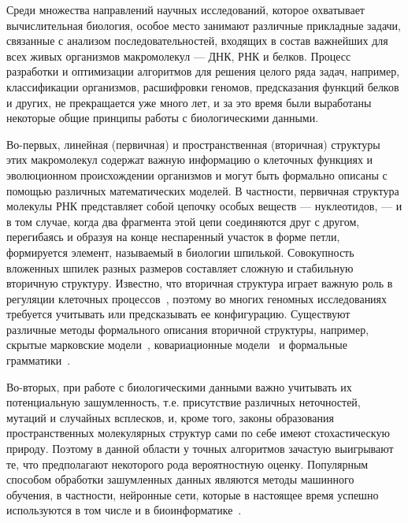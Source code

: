 Среди множества направлений научных исследований, которое охватывает вычислительная биология, особое место занимают различные прикладные задачи, связанные с анализом последовательностей, входящих в состав важнейших для всех живых организмов макромолекул --- ДНК, РНК и белков. Процесс разработки и оптимизации алгоритмов для решения целого ряда задач, например, классификации организмов, расшифровки геномов, предсказания функций белков и других, не прекращается уже много лет, и за это время были выработаны некоторые общие принципы работы с биологическими данными.

Во-первых, линейная (первичная) и пространственная (вторичная) структуры этих макромолекул содержат важную информацию о клеточных функциях и эволюционном происхождении организмов и могут быть формально описаны с помощью различных математических моделей. В частности, первичная структура молекулы РНК представляет собой цепочку особых веществ --- нуклеотидов, --- и в том случае, когда два фрагмента этой цепи соединяются друг с другом, перегибаясь и образуя на конце неспаренный участок в форме петли, формируется элемент, называемый в биологии шпилькой. Совокупность вложенных шпилек разных размеров составляет сложную и стабильную вторичную структуру. Известно, что вторичная структура играет важную роль в регуляции клеточных процессов~\cite{vandivier2016conservation}, поэтому во многих геномных исследованиях требуется учитывать или предсказывать ее конфигурацию. Существуют различные методы формального описания вторичной структуры, например, скрытые марковские модели~\cite{yoon2004hmm}, ковариационные модели~\cite{sippl1999biological} и формальные грамматики~\cite{dowell2004evaluation,knudsen1999rna,rivas2000language}.

Во-вторых, при работе с биологическими данными важно учитывать их потенциальную зашумленность, т.е. присутствие различных неточностей, мутаций и случайных всплесков, и, кроме того, законы образования пространственных молекулярных структур сами по себе имеют стохастическую природу. Поэтому в данной области у точных алгоритмов зачастую выигрывают те, что предполагают некоторого рода вероятностную оценку. Популярным способом обработки зашумленных данных являются методы машинного обучения, в частности, нейронные сети, которые в настоящее время успешно используются в том числе и в биоинформатике~\cite{higashi2009bacteria,sherman2017humidor}.


